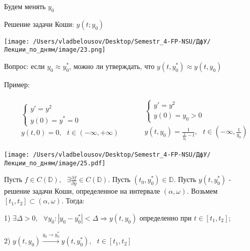 \documentclass[12pt, a4paper]{report}
\begin{document}
Будем менять \( y_0 \)

Решение задачи Коши: \( y (t; y_0) \) 

\begin{center}
    \texttt{[image: /Users/vladbelousov/Desktop/Semestr\_4-FP-NSU/ДфУ/Лекции\_по\_дням/image/23.png]}
\end{center}

Вопрос: если \( y_0 \approx y_0^* \), можно ли утверждать, что \( y(t, y_0 ^* ) \approx y (t, y_0) \) 

Пример: 

\[ \begin{aligned}
    \begin{aligned}
        &\begin{cases}
            y ' = y ^2  \\ 
            y(0 ) = y^* = 0 
        \end{cases} \\
        &y(t, 0 )=0 , \text{ } t \in (-\infty , +\infty )
    \end{aligned}
    \quad \quad  
    \begin{aligned}
        &\begin{cases}
            y ' = y ^2 \\
            y(0) = y_0 > 0
        \end{cases} \\
        &y(t,y_0) = \frac{1 }{\frac{1}{y_0 } -t } , \text{ } t \in  \left( -\infty , \frac{1}{y_0}  \right)
    \end{aligned}
\end{aligned} \] 

\begin{center}
    \texttt{[image: /Users/vladbelousov/Desktop/Semestr\_4-FP-NSU/ДфУ/Лекции\_по\_дням/image/25.pdf]}
\end{center}

\begin{theorem}
    Пусть \( f \in C(\mathbb{D}) , \text{ } \exists \frac{\partial f}{\partial y} \in C(\mathbb{D}) \). Пусть \((t_0, y_0^*) \in \mathbb{D}\). Пусть \( y(t, y_0^*) \) - решение задачи Коши, определенное на интервале \( (\alpha, \omega) \). Возьмем \( [t_1, t_2] \subset (\alpha, \omega) \). Тогда:

    1) \( \exists \Delta > 0 , \text{ }  \forall  y_0 : \left\lvert y_0 - y_0 ^*  \right\rvert < \Delta \Rightarrow y(t, y_0)\)  определенно при \( t \in  [t_1, t_2 ] \); 
    
    2) \( y(t, y_0 ) \xrightarrow{y_0 \to  y_0^* } y(t, y_0^*) , \text{ }  t \in [t_1, t_2 ]  \)
\end{theorem}
\end{document}
